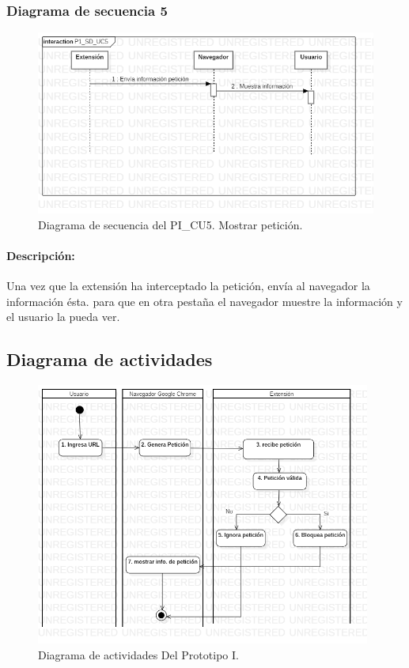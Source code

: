 \documentclass[12pt, a4paper, titlepage]{report}
\begin{document}
			    \subsubsection{Diagrama de secuencia 5}
			    \begin{figure}[H]
				    \begin{center} \includegraphics[width=15cm]{./imagenes/Desarrollo/Prototipo_1/P1_SD_UC5.png}
				    \caption[Diagrama de secuencia 5 del Prototipo I]{Diagrama de secuencia del PI\_CU5. Mostrar petición.}
			        \end{center}
			    \end{figure}
			        
			    \paragraph{Descripción:}
			    Una vez que la extensión ha interceptado la petición, envía al navegador la información ésta. para que en otra pestaña el navegador muestre la información y el usuario la pueda ver.
			        
			\subsection{Diagrama de actividades}
			    \begin{figure}[H]
				    \begin{center} \includegraphics[width=11cm]{./imagenes/Desarrollo/Prototipo_1/DA_P1.png}
				        \caption{Diagrama de actividades Del Prototipo I.}
			        \end{center}
			    \end{figure}
			    
\end{document}
